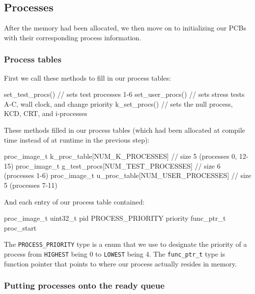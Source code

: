 \documentclass[12pt]{article}
\begin{document}
\subsection{Processes}
After the memory had been allocated, we then move on to initializing our PCBs with their corresponding process information.

\subsubsection{Process tables}

First we call these methods to fill in our process tables:
\begin{code}
set_test_procs() // sets test processes 1-6
set_user_procs() // sets stress tests A-C, wall clock, and change priority
k_set_procs() // sets the null process, KCD, CRT, and i-processes
\end{code}

These methods filled in our process tables (which had been allocated at compile time instead of at runtime in the previous step):
\begin{code}
proc_image_t k_proc_table[NUM_K_PROCESSES] // size 5 (processes 0, 12-15)
proc_image_t g_test_procs[NUM_TEST_PROCESSES] // size 6 (processes 1-6)
proc_image_t u_proc_table[NUM_USER_PROCESSES] // size 5 (processes 7-11)
\end{code}

And each entry of our process table contained:
\begin{code}
proc_image_t
    uint32_t pid
    PROCESS_PRIORITY priority
    func_ptr_t proc_start
\end{code}

The \texttt{PROCESS\_PRIORITY} type is a enum that we use to designate the priority of a process from \texttt{HIGHEST} being 0 to \texttt{LOWEST} being 4. The \texttt{func\_ptr\_t} type is function pointer that points to where our process actually resides in memory. 

\subsubsection{Putting processes onto the ready queue}
\end{document}
